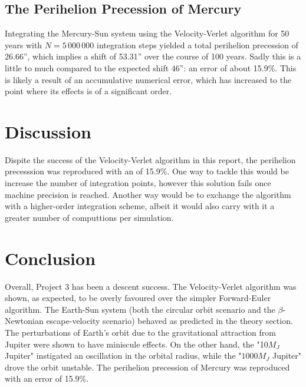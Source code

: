 \documentclass[reprint,english]{revtex4-1}
\begin{document}
\subsection{The Perihelion Precession of Mercury}
Integrating the Mercury-Sun system using the Velocity-Verlet algorithm for 50 years with \(N=5\,000\,000\) integration steps yielded a total perihelion precession of 26.66'', which implies a shift of 53.31'' over the course of 100 years. Sadly this is a little to much compared to the expected shift 46'': an error of about 15.9\%. This is likely a result of an accumulative numerical error, which has increased to the point where its effects is of a significant order. 
\section{Discussion}
Dispite the success of the Velocity-Verlet algorithm in this report, the perihelion precesssion was reproduced with an of 15.9\%. One way to tackle this would be increase the number of integration points, however this solution fails once machine precision is reached. Another way would be to exchange the algorithm with a higher-order integration scheme, albeit it would also carry with it a greater number of computtions per simulation.


\section{Conclusion}
Overall, Project 3 has been a descent success. The Velocity-Verlet algorithm was shown, as expected, to be overly favoured over the simpler Forward-Euler algorithm. The Earth-Sun system (both the circular orbit scenario and the \(\beta\)-Newtonian escape-velocity scenario) behaved as predicted in the theory section. The perturbations of Earth's orbit due to the gravitational attraction from Jupiter were shown to have miniscule effects. On the other hand, the "10\(M_J\) Jupiter" instigated an oscillation in the orbital radius, while the "\(1000M_J\) Jupiter" drove the orbit unstable. The perihelion precession of Mercury was reproduced with an error of 15.9\%.



\end{document}
